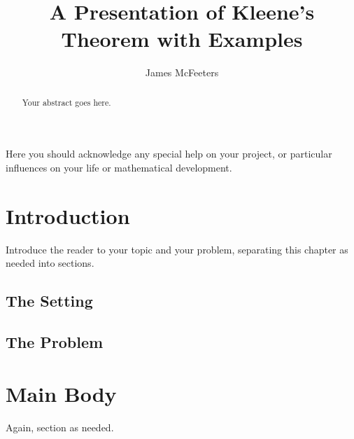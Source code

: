 \documentclass{bcthesis}
\title{A Presentation of Kleene's Theorem with Examples}
\author{James McFeeters}
\begin{document}
\frontmatter

\maketitle

\begin{abstract}
	Your abstract goes here.
\end{abstract}



\begin{acknowledgments}
	Here you should acknowledge any special help on your project, or particular influences on your life or mathematical development.
\end{acknowledgments}


\tableofcontents


\mainmatter

\chapter{Introduction}%
\label{sec:introduction}

Introduce the reader to your topic and your problem, separating this chapter as needed into sections.

\section{The Setting}

\section{The Problem }%
\label{sec:thisdoc}

\chapter{Main Body}%
\label{sec:structured-writing}

Again, section as needed.
\end{document}
